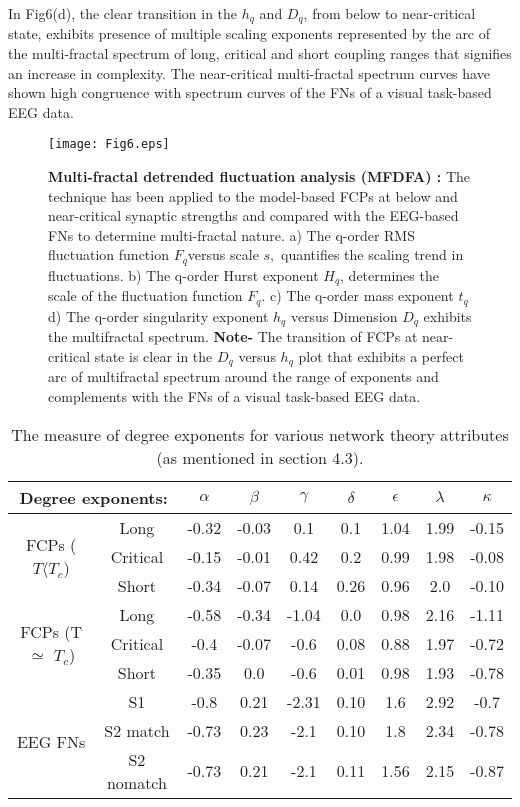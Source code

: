 \documentclass[preprintnumbers,amsmath,amssymb,onecolumn]{revtex4}
\begin{document}
In Fig6(d), the clear transition in the $h_{q}$ and $D_{q}$, from below to near-critical state, exhibits presence of multiple scaling exponents represented by the arc of the multi-fractal spectrum of long, critical and short coupling ranges that signifies an increase in complexity. The near-critical multi-fractal spectrum curves have shown high congruence with spectrum curves of the FNs of a visual task-based EEG data.
\begin{figure}
\label{fig6}
\begin{center}
\texttt{[image: Fig6.eps]}
\caption{\textbf{Multi-fractal detrended fluctuation analysis (MFDFA)
:} The technique has been applied to the model-based FCPs at below
and near-critical synaptic strengths and compared with the EEG-based
FNs to determine multi-fractal nature. a) The q-order RMS fluctuation
function $F_{q}$versus scale $s,$ quantifies the scaling trend in
fluctuations. b) The q-order Hurst exponent $H_{q}$, determines the
scale of the fluctuation function $F_{q}$. c) The q-order mass exponent
$t_{q}$ d) The q-order singularity exponent $h_{q}$ versus Dimension
$D_{q}$ exhibits the multifractal spectrum. \textbf{Note-} The transition
of FCPs at near-critical state is clear in the $D_{q}$ versus $h_{q}$
plot that exhibits a perfect arc of multifractal spectrum around the
range of exponents and complements with the FNs of a visual task-based
EEG data.} 
\end{center}
\end{figure}


\begin{table}
\begin{tabular}{|c|c|c|c|c|c|c|c|c|}
\hline 
\multicolumn{2}{|c|}{\textbf{Degree exponents:}} & \ensuremath{\alpha} & \ensuremath{\beta} & \ensuremath{\gamma} & \ensuremath{\delta} & \ensuremath{\epsilon} & \ensuremath{\lambda} & $\kappa$\tabularnewline
\hline 
\multirow{3}{*}{ FCPs ($T\langle T_{c}$)} & Long & -0.32 & -0.03 & 0.1 & 0.1 & 1.04 & 1.99 & -0.15\tabularnewline
\cline{2-9} 
 & Critical & -0.15 & -0.01 & 0.42 & 0.2 & 0.99 & 1.98 & -0.08\tabularnewline
\cline{2-9} 
 & Short & -0.34 & -0.07 & 0.14 & 0.26 & 0.96 & 2.0 & -0.10\tabularnewline
\hline 
\multirow{3}{*}{FCPs (T $\simeq$ $T_{c}$)} & Long & -0.58 & -0.34 & -1.04 & 0.0 & 0.98 & 2.16 & -1.11\tabularnewline
\cline{2-9} 
 & Critical & -0.4 & -0.07 & -0.6 & 0.08 & 0.88 & 1.97 & -0.72\tabularnewline
\cline{2-9} 
 & Short & -0.35 & 0.0 & -0.6 & 0.01 & 0.98 & 1.93 & -0.78\tabularnewline
\hline 
\multirow{3}{*}{EEG FNs} & S1 & -0.8 & 0.21 & -2.31 & 0.10 & 1.6 & 2.92 & -0.7\tabularnewline
\cline{2-9} 
 & S2 match & -0.73 & 0.23 & -2.1 & 0.10 & 1.8 & 2.34 & -0.78\tabularnewline
\cline{2-9} 
 & S2 nomatch & -0.73 & 0.21 & -2.1 & 0.11 & 1.56 & 2.15 & -0.87\tabularnewline
\hline 
\end{tabular}
\caption{The measure of degree exponents for various network theory attributes
(as mentioned in section 4.3).}
\end{table}
\end{document}
